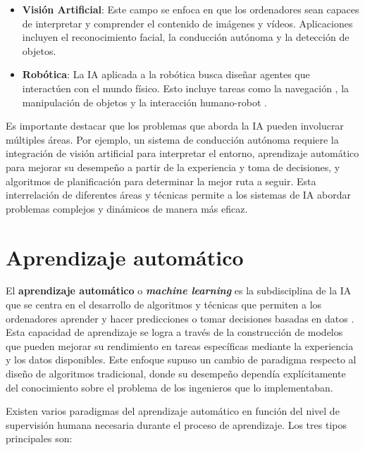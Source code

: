 \begin{itemize}
	\item \textbf{Visión Artificial}: Este campo se enfoca en que los ordenadores sean
	capaces de interpretar y comprender el contenido de imágenes y vídeos.
	Aplicaciones incluyen el reconocimiento facial, la conducción autónoma y la detección
	de objetos.
	
	\item \textbf{Robótica}: La IA aplicada a la robótica busca diseñar agentes que
	interactúen con el mundo físico. Esto incluye tareas como la navegación
	\cite{chen2019learningnavigatesimulationspatial}, la manipulación de objetos
	\cite{fu2024mobilealohalearningbimanual} y la interacción humano-robot \cite{10295118}.
\end{itemize}

Es importante destacar que los problemas que aborda la IA pueden involucrar
múltiples áreas. Por ejemplo, un sistema de conducción autónoma requiere la
integración de visión artificial para interpretar el entorno, aprendizaje automático
para mejorar su desempeño a partir de la experiencia y toma de decisiones, y
algoritmos de planificación para determinar la mejor ruta a seguir. Esta interrelación
de diferentes áreas y técnicas permite a los sistemas de IA abordar problemas complejos
y dinámicos de manera más eficaz.

\section{Aprendizaje automático}

El \textbf{aprendizaje automático} o \textbf{\textit{machine learning}} es la
subdisciplina de la IA que se centra en el desarrollo de algoritmos y técnicas
que permiten a los ordenadores aprender y hacer predicciones o tomar decisiones
basadas en datos \cite{hastie2009elements}. Esta capacidad de aprendizaje se logra
a través de la construcción de modelos que pueden mejorar su rendimiento en tareas
específicas mediante la experiencia y los datos disponibles. Este enfoque supuso
un cambio de paradigma respecto al diseño de algoritmos tradicional, donde su desempeño
dependía explícitamente del conocimiento sobre el problema de los ingenieros que
lo implementaban.

Existen varios paradigmas del aprendizaje automático en función del nivel de supervisión
humana necesaria durante el proceso de aprendizaje. Los tres tipos principales
son:

